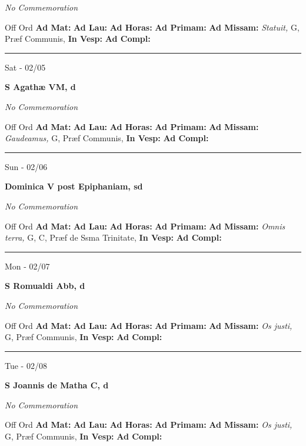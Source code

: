 \documentclass[letterpaper, 10pt]{article}
\begin{document}
\textit{No Commemoration}\begin{justify}
Off Ord
\textbf{Ad Mat: }
\textbf{Ad Lau: }
\textbf{Ad Horas: }
\textbf{Ad Primam: }
\textbf{Ad Missam:} \textit{Statuit, } G, Præf Communis, 
\textbf{In Vesp: }
\textbf{Ad Compl: }\end{justify}



\hrule
\begin{center}
Sat - 02/05
\end{center}\textbf{ \large S Agathæ VM, \textnormal{\normalsize d}}

\textit{No Commemoration}\begin{justify}
Off Ord
\textbf{Ad Mat: }
\textbf{Ad Lau: }
\textbf{Ad Horas: }
\textbf{Ad Primam: }
\textbf{Ad Missam:} \textit{Gaudeamus, } G, Præf Communis, 
\textbf{In Vesp: }
\textbf{Ad Compl: }\end{justify}



\hrule
\begin{center}
Sun - 02/06
\end{center}\textbf{ \large Dominica V post Epiphaniam, \textnormal{\normalsize sd}}

\textit{No Commemoration}\begin{justify}
Off Ord
\textbf{Ad Mat: }
\textbf{Ad Lau: }
\textbf{Ad Horas: }
\textbf{Ad Primam: }
\textbf{Ad Missam:} \textit{Omnis terra, } G, C, Præf de Ssma Trinitate, 
\textbf{In Vesp: }
\textbf{Ad Compl: }\end{justify}



\hrule
\begin{center}
Mon - 02/07
\end{center}\textbf{ \large S Romualdi Abb, \textnormal{\normalsize d}}

\textit{No Commemoration}\begin{justify}
Off Ord
\textbf{Ad Mat: }
\textbf{Ad Lau: }
\textbf{Ad Horas: }
\textbf{Ad Primam: }
\textbf{Ad Missam:} \textit{Os justi, } G, Præf Communis, 
\textbf{In Vesp: }
\textbf{Ad Compl: }\end{justify}



\hrule
\begin{center}
Tue - 02/08
\end{center}\textbf{ \large S Joannis de Matha C, \textnormal{\normalsize d}}

\textit{No Commemoration}\begin{justify}
Off Ord
\textbf{Ad Mat: }
\textbf{Ad Lau: }
\textbf{Ad Horas: }
\textbf{Ad Primam: }
\textbf{Ad Missam:} \textit{Os justi, } G, Præf Communis, 
\textbf{In Vesp: }
\textbf{Ad Compl: }\end{justify}
\end{document}
